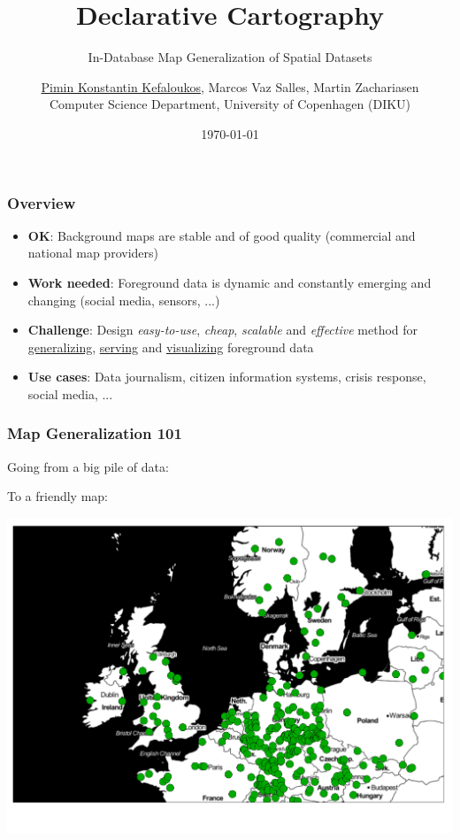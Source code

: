 \documentclass{beamer}
\title{Declarative Cartography}
\subtitle{In-Database Map Generalization of Spatial Datasets}
\author{\underline{Pimin Konstantin Kefaloukos}, Marcos Vaz Salles, Martin Zachariasen\\ \small{Computer Science Department, University of Copenhagen} (DIKU)}
\date{\today}
\begin{document}
\frame{\titlepage}

\frame
{
  \frametitle{Overview}
  \begin{center}
  \end{center}
  
  \begin{itemize}
  \item \textbf{OK}: Background maps are stable and of good quality (commercial and national map providers)
  \item \textbf{Work needed}: Foreground data is dynamic and constantly emerging and changing (social media, sensors, ...)
  \item \textbf{Challenge}: Design \emph{easy-to-use}, \emph{cheap}, \emph{scalable} and \emph{effective} method for \underline{generalizing}, \underline{serving} and \underline{visualizing} foreground data
  \item \textbf{Use cases}: Data journalism, citizen information systems, crisis response, social media, ...
  \end{itemize}

}

\frame
{
  \frametitle{Map Generalization 101}
  Going from a big pile of data:
  \begin{center}
  \end{center}
  To a friendly map:
  \begin{center}
  \includegraphics[scale=0.19]{figs/generalized-tourism.pdf}
  \end{center}
}
\end{document}
